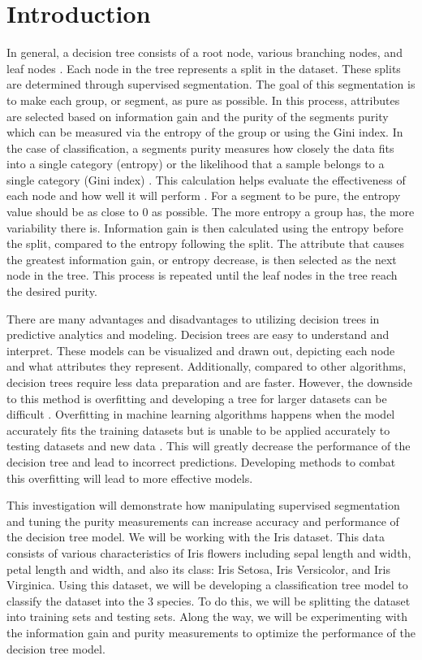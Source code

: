 \documentclass[journal]{IEEEtran}
\begin{document}
\section{Introduction}
In general, a decision tree consists of a root node, various branching nodes, and leaf nodes \cite{b1}. Each node in the tree represents a split in the dataset. These splits are determined through supervised segmentation. The goal of this segmentation is to make each group, or segment, as pure as possible. In this process, attributes are selected based on information gain and the purity of the segments purity which can be measured via the entropy of the group or using the Gini index. In the case of classification, a segment\textquotesingle s purity measures how closely the data fits into a single category (entropy) or the likelihood that a sample belongs to a single category (Gini index) \cite{b2}. This calculation helps evaluate the effectiveness of each node and how well it will perform \cite{b1}. For a segment to be pure, the entropy value should be as close to 0 as possible. The more entropy a group has, the more variability there is. Information gain is then calculated using the entropy before the split, compared to the entropy following the split. The attribute that causes the greatest information gain, or entropy decrease, is then selected as the next node in the tree. This process is repeated until the leaf nodes in the tree reach the desired purity. 

There are many advantages and disadvantages to utilizing decision trees in predictive analytics and modeling. Decision trees are easy to understand and interpret. These models can be visualized and drawn out, depicting each node and what attributes they represent. Additionally, compared to other algorithms, decision trees require less data preparation and are faster. However, the downside to this method is overfitting and developing a tree for larger datasets can be difficult \cite{b3}. Overfitting in machine learning algorithms happens when the model accurately fits the training datasets but is unable to be applied accurately to testing datasets and new data \cite{b4}. This will greatly decrease the performance of the decision tree and lead to incorrect predictions. Developing methods to combat this overfitting will lead to more effective models. 

This investigation will demonstrate how manipulating supervised segmentation and tuning the purity measurements can increase accuracy and performance of the decision tree model. We will be working with the Iris dataset. This data consists of various characteristics of Iris flowers including sepal length and width, petal length and width, and also its class: Iris Setosa, Iris Versicolor, and Iris Virginica. Using this dataset, we will be developing a classification tree model to classify the dataset into the 3 species. To do this, we will be splitting the dataset into training sets and testing sets. Along the way, we will be experimenting with the information gain and purity measurements to optimize the performance of the decision tree model. 
\end{document}
